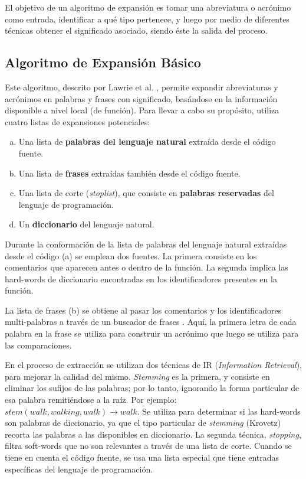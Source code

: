 El objetivo de un algoritmo de expansión es tomar una abreviatura o acrónimo como entrada, identificar a qué tipo pertenece, y luego por medio de diferentes técnicas obtener el significado asociado, siendo éste la salida del proceso.

\subsection{Algoritmo de Expansión Básico}
Este algoritmo, descrito por Lawrie et al. \cite{Lawrie:2007:EMA:1306878.1307350}, permite expandir abreviaturas y acrónimos en palabras y frases con significado, basándose en la información disponible a nivel local (de función).
Para llevar a cabo su propósito, utiliza cuatro listas de expansiones potenciales:
\begin{enumerate}[(a)]
  \item Una lista de \textbf{palabras del lenguaje natural} extraída desde el código fuente.
  \item Una lista de \textbf{frases} extraídas también desde el código fuente.
  \item Una lista de corte (\textit{stoplist}), que consiste en \textbf{palabras reservadas} del lenguaje de programación.
  \item Un \textbf{diccionario} del lenguaje natural.
\end{enumerate}

Durante la conformación de la lista de palabras del lenguaje natural extraídas desde el código (a) se emplean dos fuentes.
La primera consiste en los comentarios que aparecen antes o dentro de la función.
La segunda implica las hard-words de diccionario encontradas en los identificadores presentes en la función.

La lista de frases (b) se obtiene al pasar los comentarios y los identificadores multi-palabras a través de un buscador de frases \cite{Feng01}.
Aquí, la primera letra de cada palabra en la frase se utiliza para construir un acrónimo que luego se utiliza para las comparaciones.

En el proceso de extracción se utilizan dos técnicas de IR (\textit{Information Retrieval}), para mejorar la calidad del mismo.
\textit{Stemming} es la primera, y consiste en eliminar los sufijos de las palabras; por lo tanto, ignorando la forma particular de esa palabra remitiéndose a la raíz.
Por ejemplo: $stem(walk, walking, walk) \rightarrow walk$.
Se utiliza para determinar si las hard-words son palabras de diccionario, ya que el tipo particular de \textit{stemming} (Krovetz) recorta las palabras a las disponibles en diccionario.
La segunda técnica, \textit{stopping}, filtra soft-words que no son relevantes a través de una lista de corte.
Cuando se tiene en cuenta el código fuente, se usa una lista especial que tiene entradas específicas del lenguaje de programación.

